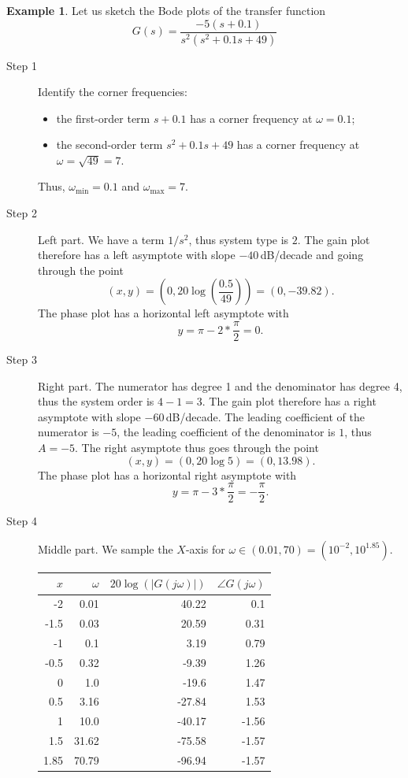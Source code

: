 \documentclass[a4paper,11pt]{report}
\theoremstyle{definition}
\newtheorem{mdexample}{Example}
\newenvironment{example}%
  {\vspace{0.1cm}\begin{mdframed}[backgroundcolor=lightgray]\begin{mdexample}}%
  {\end{mdexample}\end{mdframed}\vspace{0.1cm}}
\begin{document}
\begin{example}
  \label{ex:bode-sketch}
  Let us sketch the Bode plots of the transfer function
  \[
  G(s) = \frac{-5(s+0.1)}{s^2(s^2+0.1s+49)}
  \]

  \begin{description}
  \item[Step 1] Identify the corner frequencies:
    \begin{itemize}
    \item the first-order term $s+0.1$ has a corner frequency at
      $\omega=0.1$;
    \item the second-order term $s^2+0.1s+49$ has a corner frequency at
      $\omega=\sqrt{49}=7$. 
    \end{itemize}
    Thus, $\omega_{\min}=0.1$ and $\omega_{\max}=7$.
  \item[Step 2] Left part. We have a term $1/s^2$, thus system type is
    $2$. The gain plot therefore has a left asymptote with slope
    $-40$\,dB/decade and going through the point
    \[
    (x,y)=\left(0,20\log\left(\frac{0.5}{49}\right)\right)=(0,-39.82).
    \]
    The phase plot has a horizontal left asymptote with 
    \[
    y=\pi-2*\frac{\pi}{2}= 0.
    \]
  \item[Step 3] Right part. The numerator has degree 1 and the
    denominator has degree 4, thus the system order is $4-1=3$. The
    gain plot therefore has a right asymptote with slope
    $-60$\,dB/decade. The leading coefficient of the numerator is
    $-5$, the leading coefficient of the denominator is $1$, thus
    $A=-5$. The right asymptote thus goes through the point
    \[
    (x,y)=(0,20\log 5)=(0,13.98).
    \]
    The phase plot has a horizontal right asymptote with 
    \[
    y=\pi-3*\frac{\pi}{2}= -\frac{\pi}{2}.
    \]
  \item[Step 4] Middle part. We sample the $X$-axis for
    $\omega\in(0.01,70)=(10^{-2},10^{1.85})$.
    
  \begin{tabular}{|r|r|r|r|}
    \hline
    $x$ & $\omega$ & $20\log(|G(j\omega)|)$ & $\angle G(j\omega)$\\
    \hline
    -2 & 0.01 & 40.22 & 0.1 \\
    -1.5 & 0.03 & 20.59 & 0.31 \\
    -1 & 0.1 & 3.19 & 0.79 \\
    -0.5 & 0.32 & -9.39 & 1.26 \\
    0 & 1.0 & -19.6 & 1.47 \\
    0.5 & 3.16 & -27.84 & 1.53 \\
    1 & 10.0 & -40.17 & -1.56 \\
    1.5 & 31.62 & -75.58 & -1.57 \\
    1.85 & 70.79 & -96.94 & -1.57 \\
    \hline
  \end{tabular}


\end{description}
\end{example}
\end{document}
